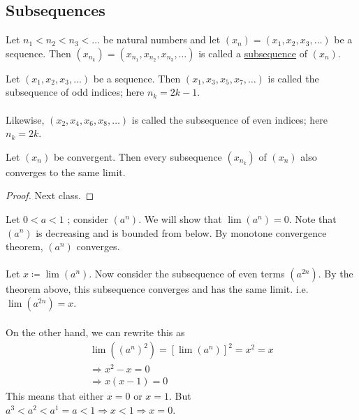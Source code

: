 \documentclass[class=scrartcl, crop=false]{standalone}
\begin{document}
\subsection{Subsequences}

\begin{definition}
  Let $n_1 < n_2 < n_3 < \dots$ be natural numbers and let $(x_n) = (x_1, x_2, x_3, \dots)$ be a sequence. Then $(x_{n_k}) = (x_{n_1}, x_{n_2}, x_{n_3},\dots)$ is called a \ul{subsequence} of $(x_n)$.
\end{definition}
\begin{example}
  Let $(x_1, x_2, x_3, \dots)$ be a sequence. Then $(x_1, x_3, x_5, x_7, \dots)$ is called the subsequence of odd indices; here $n_k = 2k - 1$.
  \\\\
  Likewise, $(x_2, x_4, x_6, x_8, \dots)$ is called the subsequence of even indices; here $n_k = 2k$.
\end{example}

\begin{theorem}
  Let $(x_n)$ be convergent. Then every subsequence $(x_{n_k})$ of $(x_n)$ also converges to the same limit.
  \begin{proof}
    Next class.
  \end{proof}
  \begin{example}
    Let $0 < a < 1$ ; consider $(a^n)$. We will show that $\lim(a^n) = 0$. Note that $(a^n)$ is decreasing and is bounded from below. By monotone convergence theorem, $(a^n)$ converges.
    \\\\
    Let $x \coloneqq \lim(a^n)$. Now consider the subsequence of even terms $(a^{2n})$. By the theorem above, this subsequence converges and has the same limit. i.e. $\lim(a^{2n}) = x$.
    \\\\
    On the other hand, we can rewrite this as 
    \begin{gather*}\lim((a^n)^2) = [\lim(a^n)]^2 = x^2 = x \\
      \Rightarrow x^2 - x = 0 \\
      \Rightarrow x(x - 1) = 0
    \end{gather*}
    This means that either $x = 0$ or $x = 1$. But $a^3 < a^2 < a^1 = a < 1 \Rightarrow x < 1 \Rightarrow x = 0$.
  \end{example}
\end{theorem}
\end{document}
